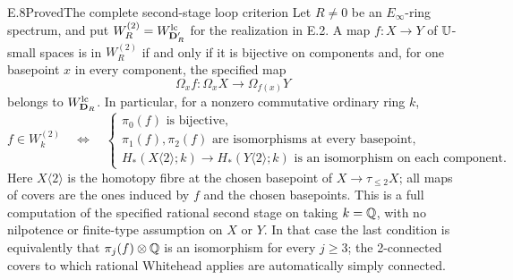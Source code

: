 \begin{claim}{E.8}{Proved}{The complete second-stage loop criterion}
Let $R\ne0$ be an $E_\infty$-ring spectrum, and put
$W_R^{(2)}=W_{\mathbf D'_R}^{\mathrm{lc}}$ for the realization in E.2.
A map $f:X\to Y$ of $\mathbb U$-small spaces is in $W_R^{(2)}$ if
and only if it is bijective on components and, for one basepoint
$x$ in every component, the specified map
\[
 \Omega_xf:\Omega_xX\longrightarrow\Omega_{f(x)}Y
\]
belongs to $W_{\mathbf D_R}^{\mathrm{lc}}$.  In particular, for a
nonzero commutative ordinary ring $k$,
\[
 f\in W_k^{(2)}
 \quad\Longleftrightarrow\quad
 \begin{cases}
 \pi_0(f)\text{ is bijective},\\
 \pi_1(f),\pi_2(f)\text{ are isomorphisms at every basepoint},\\
 H_*(X\langle2\rangle;k)\longrightarrow
 H_*(Y\langle2\rangle;k)\text{ is an isomorphism on each component}.
 \end{cases}                                                  \tag{E.8.1}
\]
Here $X\langle2\rangle$ is the homotopy fibre at the chosen
basepoint of $X\to\tau_{\le2}X$; all maps of covers are the
ones induced by $f$ and the chosen basepoints.  This is a
full computation of the specified rational second stage on
taking $k=\mathbb Q$, with no nilpotence or finite-type assumption on
$X$ or $Y$.  In that case the last condition is equivalently
that $\pi_j(f)\otimes\mathbb Q$ is an isomorphism for every $j\ge3$;
the 2-connected covers to which rational Whitehead applies are
automatically simply connected.
\end{claim}
